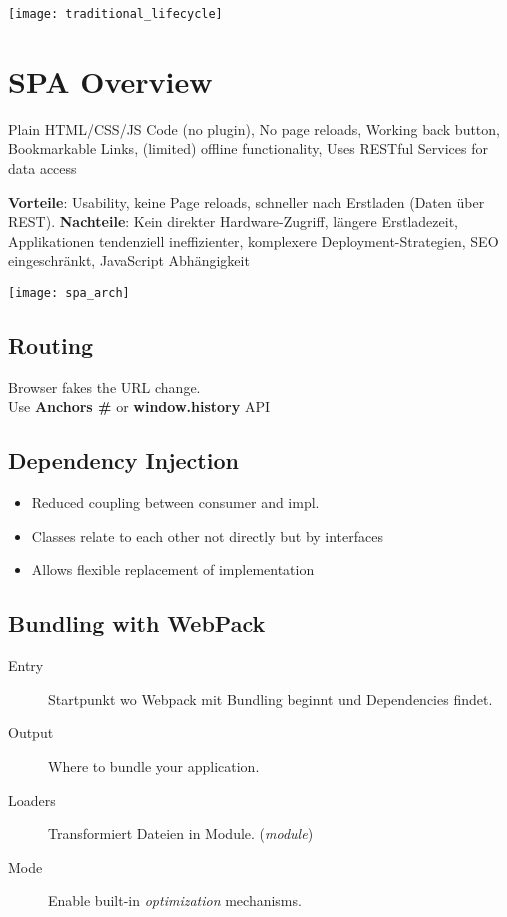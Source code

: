 

\newcommand{\TITLE}{Web Engineering 3}
\newcommand{\AUTHOR}{Mona Panchaud}
\newcommand{\INSTITUTE}{Ostschweizer Fachhochschule}




\begin{multicols*}{2}

\texttt{[image: traditional\_lifecycle]}

\section{SPA Overview}
Plain HTML/CSS/JS Code (no plugin), No page reloads,
Working back button,
Bookmarkable Links,
(limited) offline functionality,
Uses RESTful Services for data access

\textbf{Vorteile}: Usability, keine Page reloads, schneller nach Erstladen (Daten über REST).
\textbf{Nachteile}: Kein direkter Hardware-Zugriff, längere Erstladezeit, Applikationen tendenziell ineffizienter, komplexere Deployment-Strategien, SEO eingeschränkt, JavaScript Abhängigkeit

\texttt{[image: spa\_arch]}

\subsection{Routing}
Browser fakes the URL change.
\\
Use \textbf{Anchors \#} or \textbf{window.history} API

\subsection{Dependency Injection}
\begin{itemize}
    \item Reduced coupling between consumer and impl.
    \item Classes relate to each other not directly but by interfaces
    \item Allows flexible replacement of implementation
\end{itemize}

\subsection{Bundling with WebPack}
\begin{description}
    \item[Entry] Startpunkt wo Webpack mit Bundling beginnt und
    Dependencies findet.
    \item[Output] Where to bundle your application.
    \item[Loaders] Transformiert Dateien in Module. (\textit{module})
    \item[Mode] Enable built-in \textit{optimization} mechanisms.
\end{description}


\end{multicols*}
